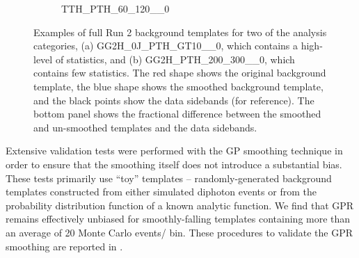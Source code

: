 \begin{figure}[h!]
\begin{subfigure}[T]{0.49\linewidth}
                \caption{TTH\_PTH\_60\_120\_\_0}
        \end{subfigure}
\caption{Examples of full Run 2 background templates for two of the analysis categories, (a)
GG2H\_0J\_PTH\_GT10\_\_0, which contains a high-level of statistics, and (b) GG2H\_PTH\_200\_300\_\_0, which contains
few statistics. The red shape shows the original background template, the blue shape shows the
smoothed background template, and the black points show the data sidebands (for reference). The
bottom panel shows the fractional difference between the smoothed and un-smoothed templates
and the data sidebands.}
\label{fig:exampleGPR}
\end{figure}

Extensive validation tests were performed with the GP smoothing technique in order to ensure that the smoothing itself does not introduce a substantial bias. These tests primarily use “toy” templates – randomly-generated background templates constructed from either simulated diphoton events or from the probability distribution function of a known analytic function. We find that GPR remains effectively unbiased for smoothly-falling templates containing more than an average of 20 Monte Carlo events/ bin. These procedures to validate the GPR smoothing are reported in \App{\ref{sec:GPR_validation}}.
